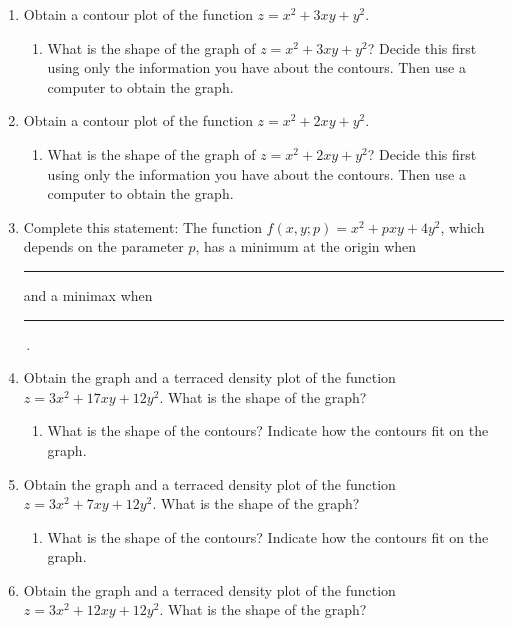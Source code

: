 \begin{enumerate}
\begin{enumerate}
\end{enumerate}
\item Obtain a contour plot of the function $z = x^2 + 3xy + y^2$.

  \begin{enumerate}
  \item What is the shape of the graph of $z = x^2 + 3xy + y^2$?  Decide
this first using only the information you have about the contours.
Then use a computer to obtain the graph.


\end{enumerate}
\item Obtain a contour plot of the function $z = x^2 + 2xy + y^2$.

  \begin{enumerate}
  \item What is the shape of the graph of $z = x^2 + 2xy + y^2$?  Decide
this first using only the information you have about the contours.
Then use a computer to obtain the graph.


\end{enumerate}
\item Complete this statement: The function $f(x, y; p) = x^2 + p xy +
4 y^2$, which depends on the parameter $p$, has a minimum at the
origin when \rule[-1pt]{30pt}{.3pt} and a minimax when
\rule[-1pt]{30pt}{.3pt}\,.


\item Obtain the graph and a terraced density plot of the function $z
= 3x^2 + 17 xy + 12 y^2$.  What is the shape of the graph?

  \begin{enumerate}
  \item What is the shape of the contours?  Indicate how the contours fit
on the graph.


\end{enumerate}
\item Obtain the graph and a terraced density plot of the function $z
= 3x^2 + 7 xy + 12 y^2$.  What is the shape of the graph?

  \begin{enumerate}
  \item What is the shape of the contours?  Indicate how the contours fit
on the graph.


\end{enumerate}
\item Obtain the graph and a terraced density plot of the function $z
= 3x^2 + 12 xy + 12 y^2$.  What is the shape of the graph?


\end{enumerate}
